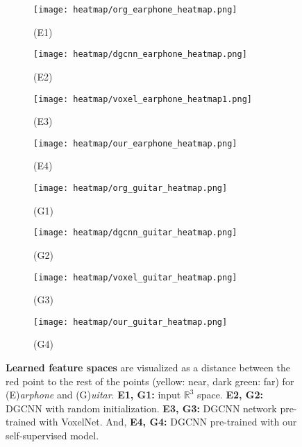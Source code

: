 \documentclass{article}
\begin{document}
\begin{figure}[h]
	\centering    
    	\begin{subfigure}{.45\textwidth}
		\centering
		\texttt{[image: heatmap/org\_earphone\_heatmap.png]}
		\caption*{(E1)}
		\label{fig:heat9}
	\end{subfigure}\begin{subfigure}{.45\textwidth}
		\centering
		\texttt{[image: heatmap/dgcnn\_earphone\_heatmap.png]}
		\caption*{(E2)}
		\label{fig:heat10}
    \end{subfigure}
    \begin{subfigure}{.45\textwidth}
		\centering
		\texttt{[image: heatmap/voxel\_earphone\_heatmap1.png]}
		\caption*{(E3)}
		\label{fig:heat11}
	\end{subfigure}\begin{subfigure}{.45\textwidth}
		\centering
		\texttt{[image: heatmap/our\_earphone\_heatmap.png]}
		\caption*{(E4)}
		\label{fig:heat12}
	\end{subfigure}
	\begin{subfigure}{.45\textwidth}
		\centering
		\texttt{[image: heatmap/org\_guitar\_heatmap.png]}
		\caption*{(G1)}
		\label{fig:heat13}
    \end{subfigure}\begin{subfigure}{.45\textwidth}
		\centering
		\texttt{[image: heatmap/dgcnn\_guitar\_heatmap.png]}
		\caption*{(G2)}
		\label{fig:heat14}
    \end{subfigure}
    \begin{subfigure}{.45\textwidth}
		\centering
		\texttt{[image: heatmap/voxel\_guitar\_heatmap.png]}
		\caption*{(G3)}
		\label{fig:heat15}
	\end{subfigure}\begin{subfigure}{.45\textwidth}
		\centering
		\texttt{[image: heatmap/our\_guitar\_heatmap.png]}
		\caption*{(G4)}
		\label{fig:heat16}
    \end{subfigure}
\caption{\textbf{Learned feature spaces} are visualized as a distance between the red point to the rest of the points (yellow: near, dark green: far) for (E)\emph{arphone} and (G)\emph{uitar}. \textbf{E1, G1:} input $\mathbb{R}^{3}$ space. \textbf{E2, G2:} DGCNN with random initialization. \textbf{E3, G3:} DGCNN network pre-trained with VoxelNet. And, \textbf{E4, G4:} DGCNN pre-trained with our self-supervised model.}
	\label{fig:heatmap_supp3}
\end{figure} 
\end{document}
